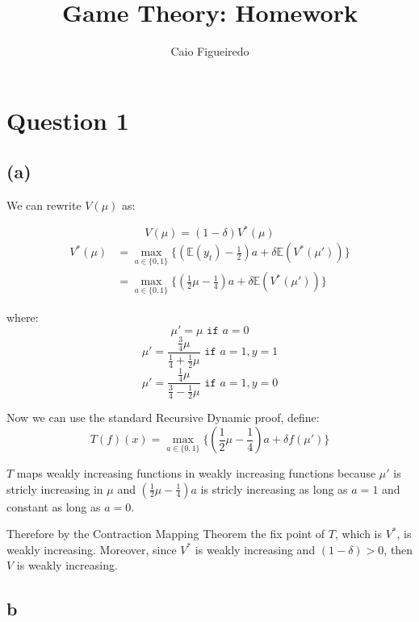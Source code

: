 \documentclass{article}
\title{Game Theory: Homework} %
\author{Caio Figueiredo} %
\begin{document}
\maketitle %


\section{Question 1}
\subsection{(a)} %

We can rewrite $V(\mu)$ as:

\[ 
  V(\mu) = (1 - \delta)V^*(\mu) 
\]
\begin{equation}
  \begin{split}
    V^*(\mu) & = \max_{a \in \{0, 1\}}\{(\mathbb{E}(y_t) - \frac{1}{2})a + \delta \mathbb{E}(V^*(\mu'))\} \\
             & = \max_{a \in \{0, 1\}}\{(\frac{1}{2}\mu  - \frac{1}{4})a + \delta \mathbb{E}(V^*(\mu'))\}
  \end{split}
\end{equation}

where:
\[
  \mu' =  \mu \texttt{ if } a = 0
\]
\[
  \mu' = \frac{\frac{3}{4}\mu}{\frac{1}{4} + \frac{1}{2}\mu} \texttt{ if } a = 1, y = 1
\]
\[
  \mu' = \frac{\frac{1}{4}\mu}{\frac{3}{4} - \frac{1}{2}\mu} \texttt{ if } a = 1, y = 0
\]

Now we can use the standard Recursive Dynamic proof, define:
\[
  T(f)(x) = \max_{a \in \{0, 1\}}\{(\frac{1}{2}\mu  - \frac{1}{4})a + \delta f(\mu') \}
\]

$T$ maps weakly increasing functions in weakly increasing functions because $\mu'$
is stricly increasing in $\mu$ and $(\frac{1}{2}\mu  - \frac{1}{4})a$ is stricly
increasing as long as $a = 1$ and constant as long as $a = 0$.

Therefore by the Contraction Mapping Theorem the fix point of $T$, which is $V^*$,
is weakly increasing. Moreover, since $V^*$ is weakly increasing and $(1 - \delta) > 0$,
then $V$ is weakly increasing.

\subsection{b} %
\end{document}
